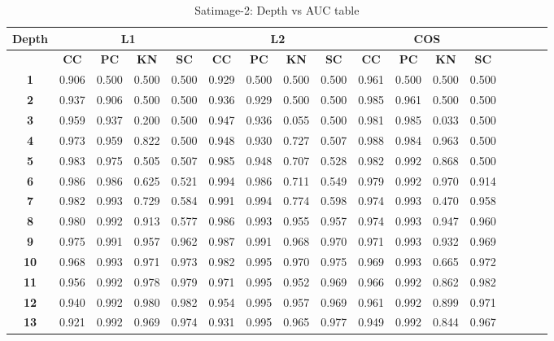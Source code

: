 \begin{table*}[!t]
\caption{Satimage-2: Depth vs AUC table}
\label{comparisons:satimage-2}
\centering
\begin{tabular}{|c|c|c|c|c|c|c|c|c|c|c|c|c|c|c|c|c|}
\hline
\bfseries Depth & \multicolumn{4}{c|}{\textbf{L1}} & \multicolumn{4}{c|}{\textbf{L2}} & \multicolumn{4}{c|}{\textbf{COS}} \\
\hline
\bfseries  & \bfseries CC & \bfseries PC & \bfseries KN & \bfseries SC & \bfseries CC & \bfseries PC & \bfseries KN & \bfseries SC & \bfseries CC & \bfseries PC & \bfseries KN & \bfseries SC \\
\hline
\bfseries 1 & 0.906 & 0.500 & 0.500 & 0.500 & 0.929 & 0.500 & 0.500 & 0.500 & 0.961 & 0.500 & 0.500 & 0.500 \\
\hline
\bfseries 2 & 0.937 & 0.906 & 0.500 & 0.500 & 0.936 & 0.929 & 0.500 & 0.500 & 0.985 & 0.961 & 0.500 & 0.500 \\
\hline
\bfseries 3 & 0.959 & 0.937 & 0.200 & 0.500 & 0.947 & 0.936 & 0.055 & 0.500 & 0.981 & 0.985 & 0.033 & 0.500 \\
\hline
\bfseries 4 & 0.973 & 0.959 & 0.822 & 0.500 & 0.948 & 0.930 & 0.727 & 0.507 & 0.988 & 0.984 & 0.963 & 0.500 \\
\hline
\bfseries 5 & 0.983 & 0.975 & 0.505 & 0.507 & 0.985 & 0.948 & 0.707 & 0.528 & 0.982 & 0.992 & 0.868 & 0.500 \\
\hline
\bfseries 6 & 0.986 & 0.986 & 0.625 & 0.521 & 0.994 & 0.986 & 0.711 & 0.549 & 0.979 & 0.992 & 0.970 & 0.914 \\
\hline
\bfseries 7 & 0.982 & 0.993 & 0.729 & 0.584 & 0.991 & 0.994 & 0.774 & 0.598 & 0.974 & 0.993 & 0.470 & 0.958 \\
\hline
\bfseries 8 & 0.980 & 0.992 & 0.913 & 0.577 & 0.986 & 0.993 & 0.955 & 0.957 & 0.974 & 0.993 & 0.947 & 0.960 \\
\hline
\bfseries 9 & 0.975 & 0.991 & 0.957 & 0.962 & 0.987 & 0.991 & 0.968 & 0.970 & 0.971 & 0.993 & 0.932 & 0.969 \\
\hline
\bfseries 10 & 0.968 & 0.993 & 0.971 & 0.973 & 0.982 & 0.995 & 0.970 & 0.975 & 0.969 & 0.993 & 0.665 & 0.972 \\
\hline
\bfseries 11 & 0.956 & 0.992 & 0.978 & 0.979 & 0.971 & 0.995 & 0.952 & 0.969 & 0.966 & 0.992 & 0.862 & 0.982 \\
\hline
\bfseries 12 & 0.940 & 0.992 & 0.980 & 0.982 & 0.954 & 0.995 & 0.957 & 0.969 & 0.961 & 0.992 & 0.899 & 0.971 \\
\hline
\bfseries 13 & 0.921 & 0.992 & 0.969 & 0.974 & 0.931 & 0.995 & 0.965 & 0.977 & 0.949 & 0.992 & 0.844 & 0.967 \\

\end{tabular}
\end{table*}
